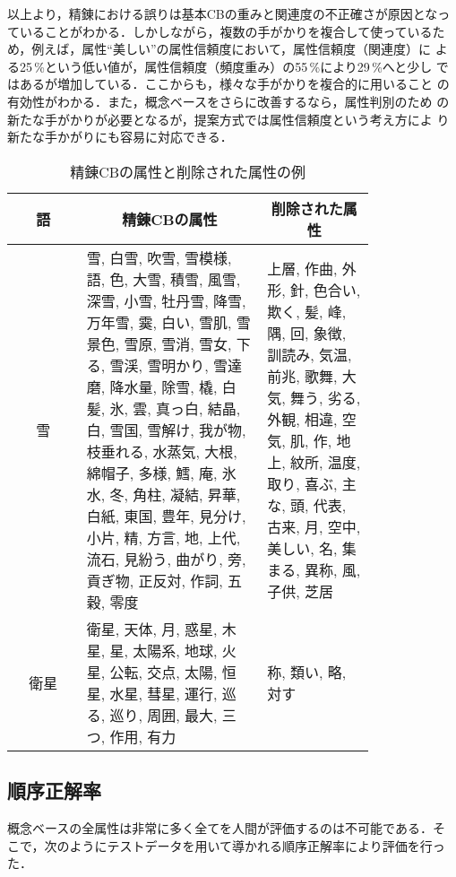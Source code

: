 以上より，精錬における誤りは基本CBの重みと関連度の不正確さが原因となっ
ていることがわかる．しかしながら，複数の手がかりを複合して使っているた
め，例えば，属性“美しい”の属性信頼度において，属性信頼度（関連度）に
よる25\,\%という低い値が，属性信頼度（頻度重み）の55\,\%により29\,\%へと少し
ではあるが増加している．ここからも，様々な手がかりを複合的に用いること
の有効性がわかる．また，概念ベースをさらに改善するなら，属性判別のため
の新たな手がかりが必要となるが，提案方式では属性信頼度という考え方によ
り新たな手かがりにも容易に対応できる．

\begin{table}[ht]
    \begin{center}
    \caption{精錬CBの属性と削除された属性の例}
    \label{tb:del_att}
    \begin{tabular}{c|p{0.5\linewidth}|p{0.3\linewidth}}
      \hline
      \hline
      \multicolumn{1}{c|}{語} &
      \multicolumn{1}{c|}{精錬CBの属性} &
      \multicolumn{1}{c}{削除された属性} \\
      \hline
      \hline
      雪 &
      雪, 白雪, 吹雪, 雪模様, 語, 色, 大雪, 積雪, 風雪, 深雪, 小雪, 牡丹雪, 降雪, 万年雪, 霙, 白い, 雪肌, 雪景色, 雪原, 雪消, 雪女, 下る, 雪渓, 雪明かり, 雪達磨, 降水量, 除雪, 橇, 白髪, 氷, 雲, 真っ白, 結晶, 白, 雪国, 雪解け, 我が物, 枝垂れる, 水蒸気, 大根, 綿帽子, 多様, 鱈, 庵, 氷水, 冬, 角柱, 凝結, 昇華, 白紙, 東国, 豊年, 見分け, 小片, 精, 方言, 地, 上代, 流石, 見紛う, 曲がり, 旁, 貢ぎ物, 正反対, 作詞, 五穀, 零度 &
      上層, 作曲, 外形, 針, 色合い, 欺く, 髪, 峰, 隅, 回, 象徴, 訓読み, 気温, 前兆, 歌舞, 大気, 舞う, 劣る, 外観, 相違, 空気, 肌, 作, 地上, 紋所, 温度, 取り, 喜ぶ, 主な, 頭, 代表, 古来, 月, 空中, 美しい, 名, 集まる, 異称, 風, 子供, 芝居 \\
      \hline
      衛星 &
      衛星, 天体, 月, 惑星, 木星, 星, 太陽系, 地球, 火星, 公転, 交点, 太陽, 恒星, 水星, 彗星, 運行, 巡る, 巡り, 周囲, 最大, 三つ, 作用, 有力 &
      称, 類い, 略, 対す \\
      \hline
      \hline
      \end{tabular}
    \end{center}
\end{table}

\subsection{順序正解率}

概念ベースの全属性は非常に多く全てを人間が評価するのは不可能である．そ
こで，次のようにテストデータを用いて導かれる順序正解率により評価を行っ
た．

